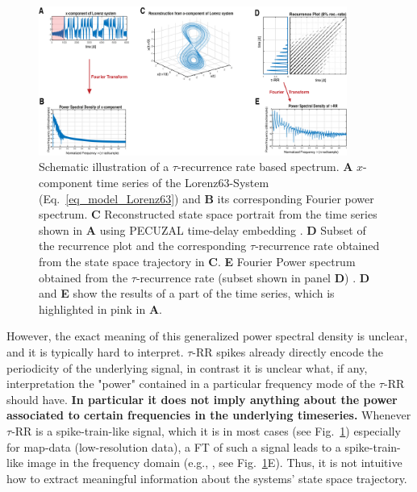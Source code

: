 \documentclass[entropy,article,submit,pdftex,moreauthors]{Definitions/mdpi}
\begin{document}
\begin{figure}
 \centering
 \includegraphics[width=0.9\textwidth]{./figures/fig_tau_rr_spectrum_example}
 \caption{Schematic illustration of a $\tau$-recurrence rate based spectrum. \textbf{A} $x$-component time series of the Lorenz63-System (Eq.~\eqref{eq_model_Lorenz63}) and 
 \textbf{B} its corresponding Fourier power spectrum. 
 \textbf{C} Reconstructed state space portrait from the time series shown in \textbf{A} using PECUZAL time-delay embedding \cite{Kraemer2021}. 
 \textbf{D} Subset of the recurrence plot and the corresponding $\tau$-recurrence rate obtained from the state space trajectory in \textbf{C}. 
 \textbf{E} Fourier Power spectrum obtained from the $\tau$-recurrence rate (subset shown in panel \textbf{D}) \cite{Zbilut2008}. \textbf{D} and \textbf{E} show the results of a part of the time series, 
 which is highlighted in pink in \textbf{A}.
 }\label{fig_tau_rr_spectrum_example}
\end{figure}

However, the exact meaning of this generalized power spectral density is unclear, and it is typically hard to interpret. $\tau$-RR spikes already directly encode the periodicity of the underlying signal, in contrast it is unclear what, if any, interpretation the "power" contained in a particular frequency mode of the $\tau$-RR should have. \textbf{In particular it does not imply anything about the power associated to certain frequencies in the underlying timeseries.} Whenever $\tau$-RR is a spike-train-like signal, which it is in most cases (see Fig.~\ref{fig_tau_rr_spectrum_example}) especially for 
map-data (low-resolution data), a FT of such a signal leads to a spike-train-like image in the frequency domain (e.g., \cite{Schild1982,Cordoba1989}, see 
Fig.~\ref{fig_tau_rr_spectrum_example}E). Thus, it is not intuitive how to extract meaningful information about the systems' state space trajectory. 
\end{document}
